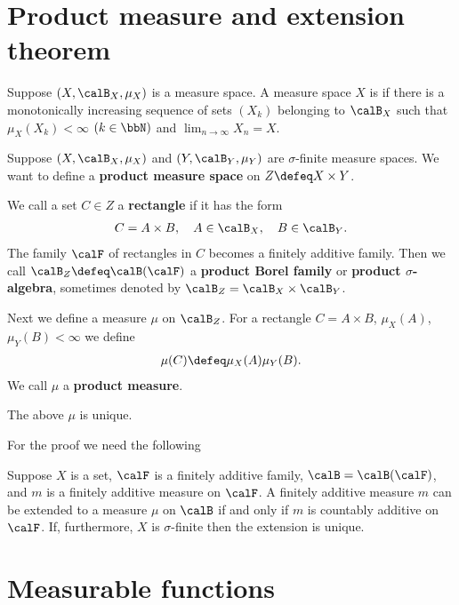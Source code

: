 \documentclass[openany, a4paper, oneside]{jsbook}
\begin{document}
\section{Product measure and extension theorem}

\begin{defn}
 Suppose $(X, \calB_X, \mu_X)$ is a measure space.
 A measure space $X$ is  if there is a monotonically increasing sequence of sets $(X_k)$ belonging to $\calB_X$
 such that $\mu_X (X_k) < \infty$ $(k \in \bbN)$ and $\lim_{n \to \infty} X_n = X$.
\end{defn}
Suppose $(X, \calB_X, \mu_X)$ and $(Y, \calB_Y, \mu_Y)$ are $\sigma$-finite measure spaces.
We want to define a \textbf{product measure space} on $Z \defeq X \times Y$.

We call a set $C \in Z$ a \textbf{rectangle} if it has the form
\begin{align}
 C
 =
 A \times B, \quad A \in \calB_X, \quad B \in \calB_Y.
\end{align}
The family $\calF$ of rectangles in $C$ becomes a finitely additive family.
Then we call $\calB_Z \defeq \calB (\calF)$ a \textbf{product Borel family} or \textbf{product $\sigma$-algebra},
sometimes denoted by $\calB_Z = \calB_X \times \calB_Y$.

Next we define a measure $\mu$ on $\calB_Z$.
For a rectangle $C = A \times B$, $\mu_X (A)$, $\mu_Y (B) < \infty$ we define
\begin{align}
 \mu (C)
 \defeq
 \mu_X (A) \mu_Y (B).
\end{align}
We call $\mu$ a \textbf{product measure}.
\begin{thm}
 The above $\mu$ is unique.
\end{thm}
For the proof we need the following
\begin{thm}
 Suppose $X$ is a set, $\calF$ is a finitely additive family, $\calB = \calB (\calF)$, and $m$ is a finitely additive measure on $\calF$.
 A finitely additive measure $m$ can be extended to a measure $\mu$ on $\calB$ if and only if $m$ is countably additive on $\calF$.
 If, furthermore, $X$ is $\sigma$-finite then the extension is unique.
\end{thm}
\section{Measurable functions}
\end{document}
